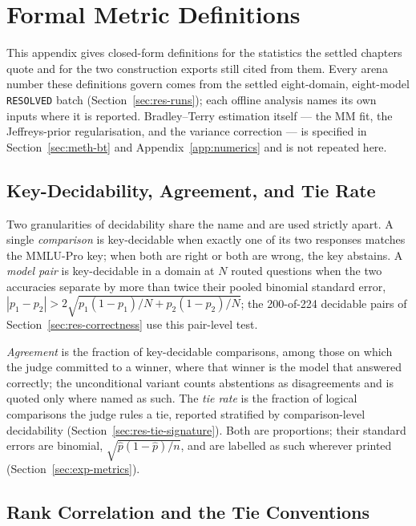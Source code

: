 \chapter{Formal Metric Definitions}\label{app:metrics}

This appendix gives closed-form definitions for the statistics the settled chapters
quote and for the two construction exports still cited from them. Every arena number
these definitions govern comes from the settled eight-domain, eight-model
\texttt{RESOLVED} batch (Section~\ref{sec:res-runs}); each offline analysis names its
own inputs where it is reported. Bradley--Terry estimation itself --- the MM fit, the
Jeffreys-prior regularisation, and the variance correction --- is specified in
Section~\ref{sec:meth-bt} and Appendix~\ref{app:numerics} and is not repeated here.

\section{Key-Decidability, Agreement, and Tie Rate}\label{sec:app-metrics-decidable}

Two granularities of decidability share the name and are used strictly apart. A single
\emph{comparison} is key-decidable when exactly one of its two responses matches the
MMLU-Pro key; when both are right or both are wrong, the key abstains. A \emph{model
pair} is key-decidable in a domain at $N$ routed questions when the two accuracies
separate by more than twice their pooled binomial standard error,
$|p_1 - p_2| > 2\sqrt{p_1(1-p_1)/N + p_2(1-p_2)/N}$; the 200-of-224 decidable pairs of
Section~\ref{sec:res-correctness} use this pair-level test.

\emph{Agreement} is the fraction of key-decidable comparisons, among those on which
the judge committed to a winner, where that winner is the model that answered
correctly; the unconditional variant counts abstentions as disagreements and is quoted
only where named as such. The \emph{tie rate} is the fraction of logical comparisons
the judge rules a tie, reported stratified by comparison-level decidability
(Section~\ref{sec:res-tie-signature}). Both are proportions; their standard errors are
binomial, $\sqrt{\hat p(1-\hat p)/n}$, and are labelled as such wherever printed
(Section~\ref{sec:exp-metrics}).

\section{Rank Correlation and the Tie Conventions}\label{sec:app-metrics-rho}

